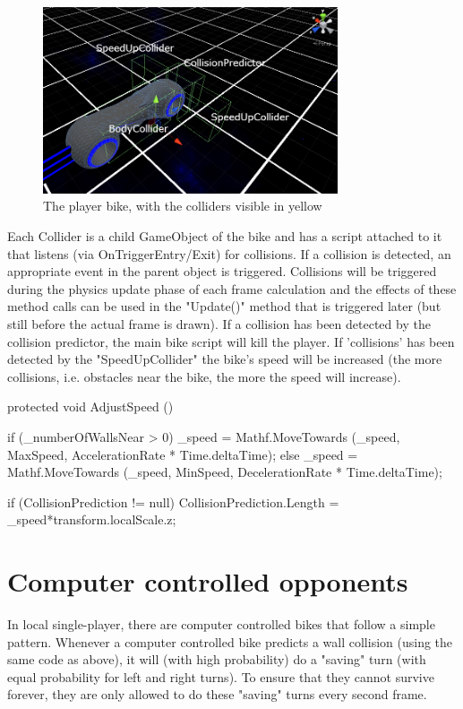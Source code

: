 \documentclass{report}
\begin{document}
 \begin{figure}
 	 	    \includegraphics[height=5.5cm]{collision_meshes_text}
 	  
 	 	\caption{The player bike, with the colliders visible in yellow }
 \end{figure}

Each Collider is a child GameObject of the bike and has a script attached to it that listens (via OnTriggerEntry/Exit) for collisions. If a collision is detected, an appropriate event in the parent object is triggered. 
Collisions will be triggered during the physics update phase of each frame calculation and the effects of these method calls can be used in the "Update()" method that is triggered later (but still before the actual frame is drawn). If a collision has been detected by the collision predictor, the main bike script will kill the player.
If 'collisions' has been detected by the "SpeedUpCollider" the bike's speed will be increased (the more collisions, i.e. obstacles near the bike, the more the speed will increase).
\begin{CS}
protected void AdjustSpeed () {
		if (_numberOfWallsNear > 0) {
			_speed = Mathf.MoveTowards (_speed, MaxSpeed, AccelerationRate * Time.deltaTime);
		} else {
			_speed = Mathf.MoveTowards (_speed, MinSpeed, DecelerationRate * Time.deltaTime);
		}
		
		if (CollisionPrediction != null)
			CollisionPrediction.Length = _speed*transform.localScale.z;
	}
	\end{CS}


 
\section{Computer controlled opponents}
In local single-player, there are computer controlled bikes that follow a simple pattern. 
Whenever a computer controlled bike predicts a wall collision (using the same code as above), it will (with high probability) do a "saving" turn (with equal probability for left and right turns). To ensure that they cannot survive forever, they are only allowed to do these "saving" turns every second frame.
\end{document}
